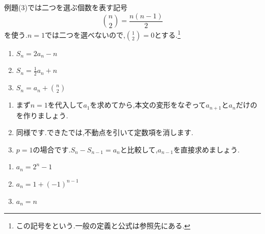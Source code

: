 例題(3)では二つを選ぶ個数を表す記号
\[
  \binom n2=\frac{n(n-1)}2
\]
を使う.$n=1$では二つを選べないので,$\binom12=0$とする.\footnote{この記号をという.一般の定義と公式は参照先にある.}
\noindent {}\par\nobreak
\begin{enumerate}[label=(\arabic*),parsep=3pt,format=\bookitemlink{example-summation-1}{problem}{answer}]
  \item $\displaystyle S_n=2a_n-n$
  \item $\displaystyle S_n=\frac12a_n+n$
  \item $\displaystyle S_n=a_n+\binom n2$
\end{enumerate}

\noindent{}\par\nobreak
\begin{enumerate}[label=(\arabic*),parsep=3pt,format=\bookitemlink{example-summation-1}{hint}{problem}]
  \item まず$n=1$を代入して$a_1$を求めてから,本文の変形をなぞって$a_{n+1}$と$a_n$だけのを作りましょう.
  \item 同様です.できたでは,不動点を引いて定数項を消します.
  \item $p=1$の場合です.$S_n-S_{n-1}=a_n$と比較して,$a_{n-1}$を直接求めましょう.
\end{enumerate}

\noindent{}\par\nobreak
\begin{enumerate}[label=(\arabic*),parsep=3pt,format=\bookitemlink{example-summation-1}{answer}{problem}]
  \item $\displaystyle a_n=2^n-1$
  \item $\displaystyle a_n=1+(-1)^{n-1}$
  \item $\displaystyle a_n=n$
\end{enumerate}

